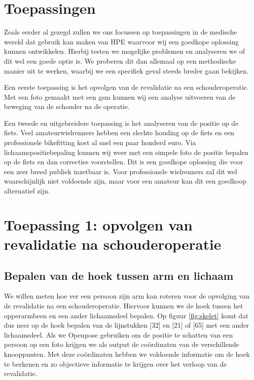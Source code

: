 \documentclass{article}
\begin{document}
\section{Toepassingen}
Zoals eerder al gezegd zullen we ons focussen op toepassingen in de medische wereld dat gebruik kan maken van HPE waarvoor wij een goedkope oplossing kunnen ontwikkelen. Hierbij testen we mogelijke problemen en analyseren we of dit wel een goede optie is. We proberen dit dan allemaal op een methodische manier uit te werken, waarbij we een specifiek geval steeds breder gaan bekijken.


Een eerste toepassing is het opvolgen van de revalidatie na een schouderoperatie. Met een foto gemaakt met een gsm kunnen wij een analyse uitvoeren van de beweging van de schouder na de operatie.

Een tweede en uitgebreidere toepassing is het analyseren van de positie op de fiets. Veel amateurwielrenners hebben een slechte houding op de fiets en een professionele bikefitting kost al snel een paar honderd euro. Via lichaamspositiebepaling kunnen wij weer met een simpele foto de positie bepalen op de fiets en dan correcties voorstellen. Dit is een goedkope oplossing die voor een zeer breed publiek inzetbaar is. Voor professionele wielrenners zal dit wel waarschijnlijk niet voldoende zijn, maar voor een amateur kan dit een goedkoop alternatief zijn.



\section{Toepassing 1: opvolgen van revalidatie na schouderoperatie}
	\subsection{Bepalen van de hoek tussen arm en lichaam}

We willen meten hoe ver een persoon zijn arm kan roteren voor de opvolging van de revalidatie na een schouderoperatie. Hiervoor kunnen we de hoek tussen het opperarmbeen en een ander lichaamsdeel bepalen. Op figuur \ref{fig:skelet} komt dat dus neer op de hoek bepalen van de lijnstukken [32] en [21] of [65] met een ander lichaamsdeel. Als we Openpose gebruiken om de positie te schatten van een persoon op een foto krijgen we als output de coördinaten van de verschillende knooppunten. Met deze coördinaten hebben we voldoende informatie om de hoek te berkenen en zo objectieve informatie te krijgen over het verloop van de revalidatie.
\end{document}
